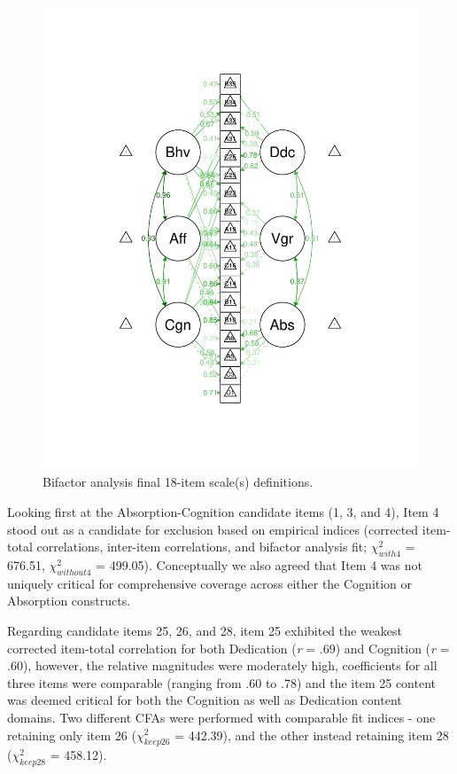 \documentclass[
  man]{apa6}
\begin{document}
\begin{figure}
\centering
\includegraphics{20to18_files/figure-latex/19to18-1.pdf}
\caption{\label{fig:19to18}Bifactor analysis final 18-item scale(s) definitions.}
\end{figure}

Looking first at the Absorption-Cognition candidate items (1, 3, and 4), Item 4 stood out as a candidate for exclusion based on empirical indices (corrected item-total correlations, inter-item correlations, and bifactor analysis fit; \(\chi^2_{with4}\) = 676.51, \(\chi^2_{without4}\) = 499.05). Conceptually we also agreed that Item 4 was not uniquely critical for comprehensive coverage across either the Cognition or Absorption constructs.

Regarding candidate items 25, 26, and 28, item 25 exhibited the weakest corrected item-total correlation for both Dedication (\emph{r} = .69) and Cognition (\emph{r} = .60), however, the relative magnitudes were moderately high, coefficients for all three items were comparable (ranging from .60 to .78) and the item 25 content was deemed critical for both the Cognition as well as Dedication content domains. Two different CFAs were performed with comparable fit indices - one retaining only item 26 (\(\chi^2_{keep26}\) = 442.39), and the other instead retaining item 28 (\(\chi^2_{keep28}\) = 458.12).
\end{document}

